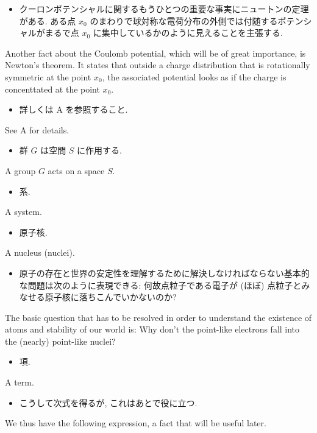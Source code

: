 \documentclass[openany, a4paper, oneside]{jsbook}
\begin{document}
\begin{itemize}
\item クーロンポテンシャルに関するもうひとつの重要な事実にニュートンの定理がある.
ある点 $x_0$ のまわりで球対称な電荷分布の外側では付随するポテンシャルがまるで点
$x_0$ に集中しているかのように見えることを主張する. \cite{LiebSeiringer1}
\end{itemize}
Another fact about the Coulomb potential, which will be of great importance,
is Newton's theorem.
It states that outside a charge distribution that is rotationally symmetric at the
point $x_0$, the associated potential looks as if the charge is concenttated at the point $x_0$.

\begin{itemize}
\item 詳しくは A を参照すること.
\end{itemize}
See A for details.

\begin{itemize}
\item 群 $G$ は空間 $S$ に作用する.
\end{itemize}
A group $G$ acts on a space $S$.

\begin{itemize}
\item 系.
\end{itemize}
A system.

\begin{itemize}
\item 原子核.
\end{itemize}
A nucleus (nuclei).

\begin{itemize}
\item 原子の存在と世界の安定性を理解するために解決しなければならない基本的な問題は次のように表現できる:
何故点粒子である電子が (ほぼ) 点粒子とみなせる原子核に落ちこんでいかないのか? \cite{LiebSeiringer1}
\end{itemize}
The basic question that has to be resolved in order to understand the existence of atoms and stability of our world is:
Why don't the point-like electrons fall into the (nearly) point-like nuclei?

\begin{itemize}
\item 項.
\end{itemize}
A term.

\begin{itemize}
\item こうして次式を得るが, これはあとで役に立つ. \cite{LiebSeiringer1}
\end{itemize}
We thus have the following expression, a fact that will be useful later.
\end{document}
